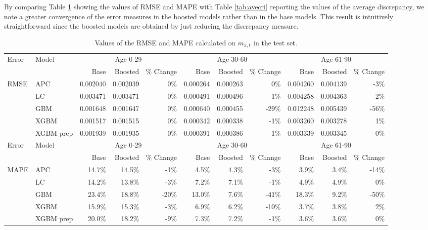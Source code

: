 \documentclass[fleqn,10pt]{wlscirep}
\begin{document}
By comparing Table \ref{tab:errors} showing the values of RMSE and MAPE with Table \ref{tab:avecri} reporting the values of the average discrepancy, we note a greater convergence of the error measures in the boosted models rather than in the base models. This result is intuitively straightforward since the boosted models are obtained by just reducing the discrepancy measure. 
%
\begin{table}[ht]
\centering
\footnotesize
\begin{tabular}{|l|l|r|r|r|r|r|r|r|r|r|}
\hline
\multirow{2}{*}{Error} & \multirow{2}{*}{Model} & \multicolumn{3}{c|}{Age 0-29} & \multicolumn{3}{c|}{Age 30-60} & \multicolumn{3}{c|}{Age 61-90} \\
\cline{3-11}
&			&	Base 	&	Boosted 	& \% Change &	Base 	&	Boosted 	& \% Change &	Base 	&	Boosted	& \% Change\\
\hline
\multirow{5}{*}{RMSE}  & APC 	&	0.002040	&	0.002039	&	0\%	&	0.000264	&	0.000263	&	0\%	&	0.004260	&	0.004139	&	-3\%	\\
& LC 	&	0.003471	&	0.003471	&	0\%	&	0.000491	&	0.000496	&	1\%	&	0.004258	&	0.004363	&	2\%	\\
& GBM 	&	0.001648	&	0.001647	&	0\%	&	0.000640	&	0.000455	&	-29\%	&	0.012248	&	0.005439	&	-56\%	\\
& XGBM 	&	0.001517	&	0.001515	&	0\%	&	0.000342	&	0.000338	&	-1\%	&	0.003260	&	0.003278	&	1\%	\\
& XGBM prep 	&	0.001939	&	0.001935	&	0\%	&	0.000391	&	0.000386	&	-1\%	&	0.003339	&	0.003345	&	0\%	\\
\hline
\multirow{2}{*}{Error} & \multirow{2}{*}{Model} & \multicolumn{3}{c|}{Age 0-29} & \multicolumn{3}{c|}{Age 30-60} & \multicolumn{3}{c|}{Age 61-90} \\
\cline{3-11}
&			&	Base 	&	Boosted 	& \% Change &	Base 	&	Boosted 	& \% Change &	Base 	&	Boosted	& \% Change\\
\hline
\multirow{5}{*}{MAPE}  & APC 			&	14.7\%	&	14.5\%	&	-1\%		&	4.5\%	&	4.3\%	&	-3\%		&	3.9\%	&	3.4\%	&	-14\% \\
& LC 			&	14.2\%	&	13.8\%	&	-3\%		&	7.2\%	&	7.1\%	&	-1\%		&	4.9\%	&	4.9\%	&	0\%	\\
& GBM 		&	23.4\%	&	18.8\%	&	-20\%	&	13.0\%	&	7.6\%	&	-41\%	&	18.3\%	&	9.2\%	&	-50\% \\
& XGBM 		&	15.9\%	&	15.3\%	&	-3\%		&	6.9\%	&	6.2\%	&	-10\%	&	3.7\%	&	3.8\%	&	2\%	\\
& XGBM prep 	&	20.0\%	&	18.2\%	&	-9\%		&	7.3\%	&	7.2\%	&	-1\%		&	3.6\%	&	3.6\%	&	0\%	\\
\hline
\end{tabular}
\caption{Values of the RMSE and MAPE calculated on $m_{x,t}$ in the test set.}
\label{tab:errors}
\end{table}\\
\end{document}
